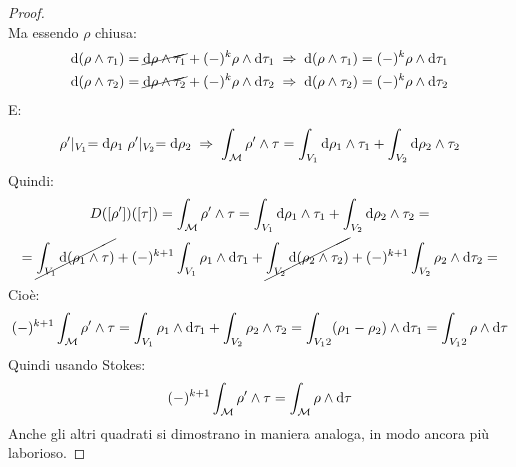 \begin{proof}
\[  \]
  Ma essendo $ \rho $ chiusa:
  \begin{gather*}
    \d {(\rho \wedge \tau_1)} = \cancel{\d \rho \wedge \tau_1} + (-)^k \rho \wedge \d \tau_1 \; \Rightarrow \; \d {(\rho \wedge \tau_1)} = (-)^k \rho \wedge \d \tau_1 \\
    \d {(\rho \wedge \tau_2)} = \cancel{\d \rho \wedge \tau_2} + (-)^k \rho \wedge \d \tau_2 \; \Rightarrow \; \d {(\rho \wedge \tau_2)} = (-)^k \rho \wedge \d \tau_2
  \end{gather*}
  E:
  \[
    \rho' \lvert_{V_1} = \operatorname{d}\!{\rho}_1 \;   \rho' \lvert_{V_2} = \operatorname{d}\!{\rho}_2 \; \Rightarrow \;  \int_{\mathcal{M}} \rho' \wedge \tau = \int_{V_1} \operatorname{d}\!{\rho}_1 \wedge \tau_1 + \int_{V_2} \operatorname{d}\!{\rho}_2 \wedge \tau_2
  \]
  Quindi:
  \begin{gather*}
    D([\rho'])([\tau]) = \int_{\mathcal{M}} \rho' \wedge \tau = \int_{V_1} \operatorname{d}\!{\rho}_1 \wedge \tau_1 + \int_{V_2} \operatorname{d}\!{\rho}_2 \wedge \tau_2 = \\
    = \cancel{\int_{V_1} \operatorname{d}\!{(\rho_1 \wedge \tau)}} + (-)^{k+1} \int_{V_1} \rho_1 \wedge \operatorname{d}\!{\tau}_1 + \cancel{\int_{V_2} \operatorname{d}\!{(\rho_2 \wedge \tau_2)}} + (-)^{k+1} \int_{V_2} \rho_2 \wedge \operatorname{d}\!{\tau}_2 =
  \end{gather*}
  Cioè:
  \[
    (-)^{k+1} \int_{\mathcal{M}} \rho' \wedge \tau = \int_{V_1} \rho_1 \wedge \operatorname{d}\!{\tau}_1 + \int_{V_2} \rho_2 \wedge \tau_2 = \int_{V_12} (\rho_1 - \rho_2) \wedge \operatorname{d}\!{\tau}_1 = \int_{V_12} \rho \wedge \operatorname{d}\!{\tau}
  \]
  Quindi usando Stokes:
  \[
    (-)^{k+1} \int_{\mathcal{M}} \rho' \wedge \tau = \int_{\mathcal{M}} \rho \wedge \operatorname{d}\!{\tau}
  \]
  Anche gli altri quadrati si dimostrano in maniera analoga, in modo ancora più laborioso.
\end{proof}


